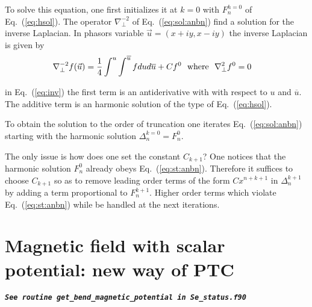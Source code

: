 \documentclass[11pt]{article} %
\def\eq#1{Eq.~(\ref{#1})}
\begin{document}
%
%
To solve this equation, one first initializes it at $k=0$ with 
%
${F}_{n}^{h=
0}$
of \eq{eq:hsol}. The operator %
${\nabla }_{\perp }^{-2}$ of \eq{eq:sol:anbn} find a solution for the inverse Laplacian. In phasors variable 
%
$\vec{u}=
\left({x+iy,x-iy}\right)$
the inverse Laplacian is   given by 
%
\begin{eqnarray}{\nabla }_{\perp }^{-2}f(\vec{u})&={1 \over 4}\int_{}^{u}\int_{}^{\overline{u}}f du d\overline{u} + C {f}^{0}~~{\rm w}{\rm h}{\rm e}{\rm r}{\rm e}~~{\nabla }_{\perp }^{2}{f}^{0}=0\label{eq:inv}\end{eqnarray}
%

in \eq{eq:inv} the first term is an antiderivative with with respect to $u$ and $ \overline{u}$. The additive term is an harmonic solution of the type of \eq{eq:hsol}. 

To obtain the solution to the order of truncation one iterates \eq{eq:sol:anbn} starting with the harmonic solution %
${\Delta }_{n}^{k=
0}=
{F}_{n}^{0}$.

The only issue is how does one set the constant ${C}_{k+1}$? One notices that the harmonic solution  ${F}_{n}^{0}$ already obeys \eq{eq:st:anbn}. Therefore it suffices to  choose ${C}_{k+1}$ so as to remove leading order terms of the form $C x^{n+k+1}$  in ${\Delta }_{n}^{k+1}$ by adding a term proportional to ${F}_{n}^{k+1}$. Higher order terms which violate \eq{eq:st:anbn} while be handled at the next iterations.



\section{Magnetic field with scalar potential: new way of PTC}

\vskip 0.5cm
{\tt \large \bf \it See routine get_bend_magnetic_potential in Se_status.f90}
\vskip 0.5cm
\end{document}
